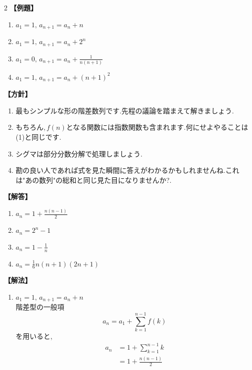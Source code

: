 \documentclass[dvipdfmx,a4paper,11pt,fleqn,openany]{jsbook}
\begin{document}
\begin{multicols*}{2}
      \noindent \textbf{【例題】}
      \begin{enumerate}[label=(\arabic*),parsep=3pt]
        \item $\displaystyle a_1=1,\, a_{n+1}=a_n+n$
        \item $\displaystyle a_1=1,\, a_{n+1}=a_n+2^n$
        \item $\displaystyle a_1=0,\, a_{n+1}=a_n+\frac{1}{n(n+1)}$
        \item $\displaystyle a_1=1,\, a_{n+1}=a_n+(n+1)^2$
      \end{enumerate}

      \noindent\textbf{【方針】}
      \begin{enumerate}[label=(\arabic*),parsep=3pt]
        \item 最もシンプルな形の階差数列です.先程の議論を踏まえて解きましょう.
        \item もちろん,\,$f(n)$となる関数には指数関数も含まれます.何にせよやることは\,(1)と同じです.
        \item シグマは部分分数分解で処理しましょう.
        \item 勘の良い人であれば式を見た瞬間に答えがわかるかもしれませんね.これは"あの数列"の総和と同じ見た目になりませんか?.
      \end{enumerate}

      \noindent\textbf{【解答】}
      \begin{enumerate}[label=(\arabic*),parsep=3pt]
        \item $\displaystyle a_n=1+\frac{n(n-1)}{2}$
        \item $\displaystyle a_n=2^n-1$
        \item $\displaystyle a_n=1-\frac{1}{n}$
        \item $\displaystyle a_n=\frac{1}{6}n(n+1)(2n+1)$
      \end{enumerate}

      \noindent\textbf{【解法】}
      \begin{enumerate}[label=(\arabic*),parsep=3pt]
        \item $\displaystyle a_1=1,\,a_{n+1}=a_n+n$\\
              階差型の一般項
              \[
                a_n=a_1+\sum_{k=1}^{n-1}f(k)
              \]
              を用いると,
              \begin{align*}
                a_n
                  &=1+\sum_{k=1}^{n-1}k\\
                  &=1+\frac{n(n-1)}{2}
              \end{align*}


\end{enumerate}
\end{multicols*}
\end{document}

